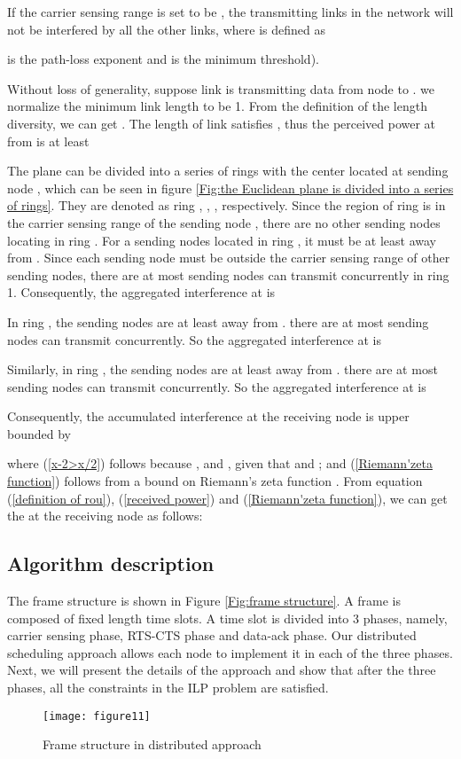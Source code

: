 \documentclass[conference]{IEEEtran}
\begin{document}
\begin{theorm}\label{theorem 2}
If the carrier sensing range is set to be , the
transmitting links in the network will not be interfered by all the
other links, where  is defined as

 is the path-loss exponent and  is the minimum 
threshold).
\end{theorm}
\begin{IEEEproof}
Without loss of generality, suppose link  is
transmitting data from node  to . we normalize the
minimum link length  to be 1. From the definition of the
length diversity, we can get . The
length of link  satisfies , thus the perceived power at  from  is at
least

The plane can be divided into a series of rings with the center
located at sending node , which can be seen in figure
\ref{Fig:the Euclidean plane is divided into a series of rings}.
They are denoted as ring , , , respectively.
Since the region of ring  is in the carrier sensing range of the
sending node , there are no other sending nodes locating in
ring . For a sending nodes  located in ring , it must be
at least  away from . Since each
sending node must be outside the carrier sensing range of other
sending nodes, there are at most 
sending nodes can transmit concurrently in ring 1. Consequently, the
aggregated interference at  is

In ring , the sending nodes are at least  away from
. there are at most  sending nodes can transmit concurrently. So
the aggregated interference at  is

Similarly, in ring , the sending nodes are at least
 away from . there are at most  sending nodes can
transmit concurrently. So the aggregated interference at  is

Consequently, the accumulated interference at the receiving node
 is upper bounded by

where (\ref{x-2>x/2}) follows because ,  and
, given that  and ; and (\ref{Riemann'zeta function}) follows
from a bound on Riemann's zeta function
\cite{goussevskaia2007complexity}. From equation (\ref{definition of
rou}), (\ref{received power}) and (\ref{Riemann'zeta function}), we
can get the  at the receiving node  as follows:


\end{IEEEproof}
\subsection{Algorithm description}
The frame structure is shown in Figure \ref{Fig:frame structure}. A
frame is composed of fixed length time slots. A time slot is divided
into 3 phases, namely, carrier sensing phase, RTS-CTS phase and
data-ack phase. Our distributed scheduling approach allows each node
to implement it in each of the three phases. Next, we will present
the details of the approach and show that after the three phases,
all the constraints in the ILP problem are satisfied.
\begin{figure}[!h]
\centering
\texttt{[image: figure11]}
\caption{Frame structure in distributed approach} \label{Fig:frame
structure}
\end{figure}
\end{document}
